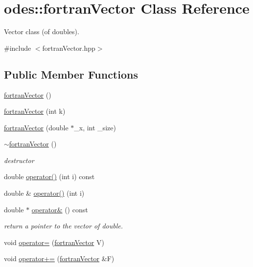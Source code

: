 \hypertarget{classodes_1_1fortranVector}{}\section{odes\+:\+:fortran\+Vector Class Reference}
\label{classodes_1_1fortranVector}


Vector class (of doubles).  




{\ttfamily \#include $<$fortran\+Vector.\+hpp$>$}

\subsection*{Public Member Functions}
\begin{DoxyCompactItemize}
\item 
\hyperlink{classodes_1_1fortranVector_a1fb7a9d331cb23faf606e9ef75c18ef1}{fortran\+Vector} ()
\item 
\hyperlink{classodes_1_1fortranVector_aaa6fa4f6992cd736fff53abc7415dd87}{fortran\+Vector} (int k)
\item 
\hyperlink{classodes_1_1fortranVector_a258c9cacdb8adf64b21a9fdcf2edf7fb}{fortran\+Vector} (double $\ast$\+\_\+x, int \+\_\+size)
\item 
\hyperlink{classodes_1_1fortranVector_a57ebd8f0cc1aa20cbe956ff5be3180c3}{$\sim$fortran\+Vector} ()
\begin{DoxyCompactList}\small\item\em destructor \end{DoxyCompactList}\item 
double \hyperlink{classodes_1_1fortranVector_acd2f3c622c5c901e0a2fcefc445fb74c}{operator()} (int i) const 
\item 
double \& \hyperlink{classodes_1_1fortranVector_a9177196a3ec94139a163e7fa8b19b92b}{operator()} (int i)
\item 
double $\ast$ \hyperlink{classodes_1_1fortranVector_ada6f1dfa695ada960f621d9728e0f8e0}{operator\&} () const 
\begin{DoxyCompactList}\small\item\em return a pointer to the vector of double. \end{DoxyCompactList}\item 
void \hyperlink{classodes_1_1fortranVector_a2efd6f462acf48bc8f064659f5a0dc40}{operator=} (\hyperlink{classodes_1_1fortranVector}{fortran\+Vector} V)
\item 
void \hyperlink{classodes_1_1fortranVector_ae522acf0f26411ce0ee14c77cddd7bfa}{operator+=} (\hyperlink{classodes_1_1fortranVector}{fortran\+Vector} \&F)

\end{DoxyCompactItemize}
